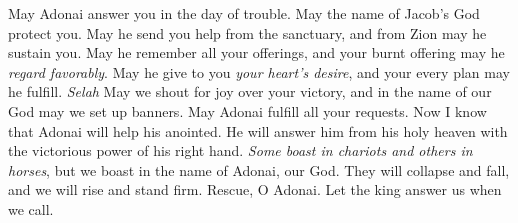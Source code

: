 \begin{biblechapter} %
 May Adonai answer you in the day of trouble. 
May the name of Jacob’s God protect you.
\verse May he send you help from the sanctuary, 
and from Zion may he sustain you.
\verse May he remember all your offerings, 
and your burnt offering may he \textit{regard favorably}.
\verse May he give to you \textit{your heart’s desire}, 
and your every plan may he fulfill. \textit{Selah}
\verse May we shout for joy over your victory, 
and in the name of our God may we set up banners. 
May Adonai fulfill all your requests.
\verse Now I know that Adonai will help his anointed. 
He will answer him from his holy heaven 
with the victorious power of his right hand.
\verse \textit{Some boast in chariots and others in horses}, 
but we boast in the name of Adonai, our God.
\verse They will collapse and fall, 
and we will rise and stand firm.
\verse Rescue, O Adonai. 
Let the king answer us when we call.
\end{biblechapter}

